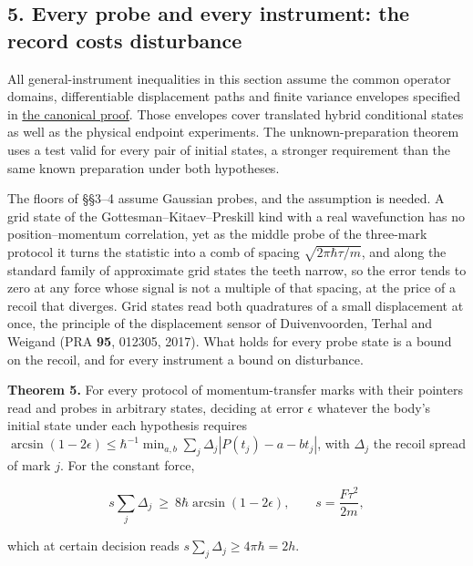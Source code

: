 \documentclass[11pt,a4paper]{article}
\begin{document}
\hypertarget{every-probe-and-every-instrument-the-record-costs-disturbance}{%
\subsection{5. Every probe and every instrument: the record costs
disturbance}\label{every-probe-and-every-instrument-the-record-costs-disturbance}}

All general-instrument inequalities in this section assume the common
operator domains, differentiable displacement paths and finite variance
envelopes specified in \href{record-distance-path-length.md}{the
canonical proof}. Those envelopes cover translated hybrid conditional
states as well as the physical endpoint experiments. The
unknown-preparation theorem uses a test valid for every pair of initial
states, a stronger requirement than the same known preparation under
both hypotheses.

The floors of §§3--4 assume Gaussian probes, and the assumption is
needed. A grid state of the Gottesman--Kitaev--Preskill kind with a real
wavefunction has no position--momentum correlation, yet as the middle
probe of the three-mark protocol it turns the statistic into a comb of
spacing \(\sqrt{2\pi\hbar\tau/m}\), and along the standard family of
approximate grid states the teeth narrow, so the error tends to zero at
any force whose signal is not a multiple of that spacing, at the price
of a recoil that diverges. Grid states read both quadratures of a small
displacement at once, the principle of the displacement sensor of
Duivenvoorden, Terhal and Weigand (PRA \textbf{95}, 012305, 2017). What
holds for every probe state is a bound on the recoil, and for every
instrument a bound on disturbance.

\textbf{Theorem 5.} For every protocol of momentum-transfer marks with
their pointers read and probes in arbitrary states, deciding at error
\(\epsilon\) whatever the body's initial state under each hypothesis
requires
\(\arcsin(1-2\epsilon)\le\hbar^{-1}\min_{a,b}\sum_j\Delta_j|P(t_j)-a-bt_j|\),
with \(\Delta_j\) the recoil spread of mark \(j\). For the constant
force,

\[s\sum_j\Delta_j\ \ge\ 8\hbar\arcsin(1-2\epsilon),\qquad s=\frac{F\tau^2}{2m}, \tag{4}\]

which at certain decision reads \(s\sum_j\Delta_j\ge4\pi\hbar=2h\).
\end{document}
